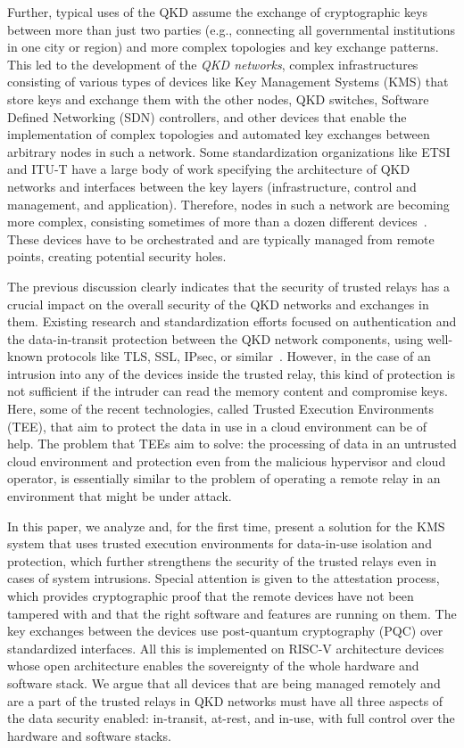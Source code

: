 \documentclass[futureinternet,article,submit,moreauthors]{Definitions/mdpi}
\begin{document}
Further, typical uses of the QKD assume the exchange of cryptographic keys between more than just two parties (e.g., connecting all governmental institutions in one city or region) and more complex topologies and key exchange patterns. This led to the development of the \emph{QKD networks}, complex infrastructures consisting of various types of devices like Key Management Systems (KMS) that store keys and exchange them with the other nodes, QKD switches, Software Defined Networking (SDN) controllers, and other devices that enable the implementation of complex topologies and automated key exchanges between arbitrary nodes in such a network. Some standardization organizations like ETSI and ITU-T have a large body of work specifying the architecture of QKD networks and interfaces between the key layers (infrastructure, control and management, and application). Therefore, nodes in such a network are becoming more complex, consisting sometimes of more than a dozen different devices~\cite{martin_madqci_2024}. These devices have to be orchestrated and are typically managed from remote points, creating potential security holes.

The previous discussion clearly indicates that the security of trusted relays has a crucial impact on the overall security of the QKD networks and exchanges in them. Existing research and standardization efforts focused on authentication and the data-in-transit protection between the QKD network components, using well-known protocols like TLS, SSL, IPsec, or similar~\cite{noauthor_quantum_2020-1,noauthor_quantum_2020}. However, in the case of an intrusion into any of the devices inside the trusted relay, this kind of protection is not sufficient if the intruder can read the memory content and compromise keys. Here, some of the recent technologies, called Trusted Execution Environments (TEE), that aim to protect the data in use in a cloud environment can be of help. The problem that TEEs aim to solve: the processing of data in an untrusted cloud environment and protection even from the malicious hypervisor and cloud operator, is essentially similar to the problem of operating a remote relay in an environment that might be under attack.

In this paper, we analyze and, for the first time, present a solution for the KMS system that uses trusted execution environments for data-in-use isolation and protection, which further strengthens the security of the trusted relays even in cases of system intrusions. Special attention is given to the attestation process, which provides cryptographic proof that the remote devices have not been tampered with and that the right software and features are running on them. The key exchanges between the devices use post-quantum cryptography (PQC) over standardized interfaces. All this is implemented on RISC-V architecture devices whose open architecture enables the sovereignty of the whole hardware and software stack. We argue that all devices that are being managed remotely and are a part of the trusted relays in QKD networks must have all three aspects of the data security enabled: in-transit, at-rest, and in-use, with full control over the hardware and software stacks.
\end{document}
